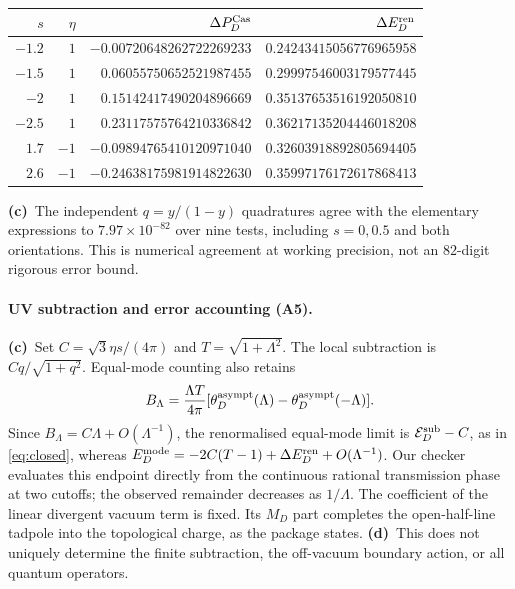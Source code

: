 \documentclass[11pt,a4paper]{article}
\newcommand{\Lc}{\textbf{(c)}\ }
\newcommand{\Ld}{\textbf{(d)}\ }
\begin{document}
\begin{center}\small
\begin{tabular}{rrrr}\toprule
$s$ & $\eta$ & $\Delta P_D^{\rm Cas}$ & $\Delta E_D^{\rm ren}$\\\midrule
$-1.2$ & $1$ & $-0.00720648262722269233$ & $0.24243415056776965958$\\
$-1.5$ & $1$ & $0.06055750652521987455$ & $0.29997546003179577445$\\
$-2$ & $1$ & $0.15142417490204896669$ & $0.35137653516192050810$\\
$-2.5$ & $1$ & $0.23117575764210336842$ & $0.36217135204446018208$\\
$1.7$ & $-1$ & $-0.09894765410120971040$ & $0.32603918892805694405$\\
$2.6$ & $-1$ & $-0.24638175981914822630$ & $0.35997176172617868413$\\\bottomrule
\end{tabular}
\end{center}
\Lc The independent $q=y/(1-y)$ quadratures agree with the elementary
expressions to $7.97\times10^{-82}$ over nine tests, including $s=0,0.5$
and both orientations. This is numerical agreement at working precision,
not an $82$-digit rigorous error bound.

\paragraph{UV subtraction and error accounting (A5).}
\Lc Set $C=\sqrt3\eta s/(4\pi)$ and $T=\sqrt{1+\Lambda^2}$.
The local subtraction is $Cq/\sqrt{1+q^2}$. Equal-mode counting also retains
\begin{equation}
 B_\Lambda=\frac{\Lambda T}{4\pi}
 [\theta_D^{\rm asympt}(\Lambda)-\theta_D^{\rm asympt}(-\Lambda)].
\end{equation}
Since $B_\Lambda=C\Lambda+O(\Lambda^{-1})$, the renormalised equal-mode
limit is $\mathcal E_D^{\rm sub}-C$, as in \eqref{eq:closed}, whereas
$E_D^{\rm mode}=-2C(T-1)+\Delta E_D^{\rm ren}+O(\Lambda^{-1})$.
Our checker evaluates this endpoint directly from the continuous rational
transmission phase at two cutoffs; the observed remainder decreases as
$1/\Lambda$. The coefficient of the linear divergent vacuum term is fixed.
Its $M_D$ part completes the open-half-line tadpole into the topological
charge, as the package states. \Ld This does not uniquely determine the
finite subtraction, the off-vacuum boundary action, or all quantum operators.
\end{document}
